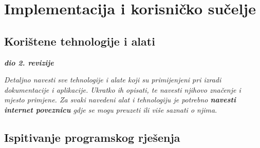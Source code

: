 \chapter{Implementacija i korisničko sučelje}
		
		
		\section{Korištene tehnologije i alati}
		
			\textbf{\textit{dio 2. revizije}}
			
			 \textit{Detaljno navesti sve tehnologije i alate koji su primijenjeni pri izradi dokumentacije i aplikacije. Ukratko ih opisati, te navesti njihovo značenje i mjesto primjene. Za svaki navedeni alat i tehnologiju je potrebno \textbf{navesti internet poveznicu} gdje se mogu preuzeti ili više saznati o njima}.
			
			
			\eject 
		
	
		\section{Ispitivanje programskog rješenja}
			
			
			
			 
			
